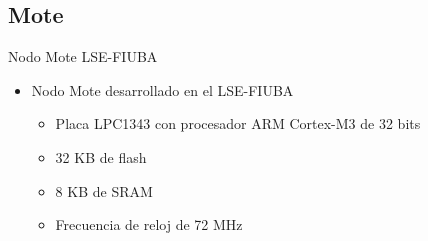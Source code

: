 \documentclass[aspectratio=169]{beamer}
\begin{document}
\subsection[Mote]{Mote}
\begin{frame}{Nodo Mote LSE-FIUBA} 

\begin{minipage}[c]{1.0\linewidth}
	\begin{minipage}[c]{0.6\linewidth}
		\begin{itemize}
			\item Nodo Mote desarrollado en el LSE-FIUBA
			\vspace{15px}
			\begin{itemize}
				\item Placa LPC1343 con procesador ARM Cortex-M3 de 32 bits
				\vspace{5px}
				\item 32 KB de flash
				\vspace{5px}
				\item 8 KB de SRAM
				\vspace{5px}
				\item Frecuencia de reloj de 72 MHz
			\end{itemize}
			\vspace{10px}
		\end{itemize}
	\end{minipage}
	\begin{minipage}[c]{0.35\linewidth}
		\begin{figure}[H]
			\label{Mote LSE}
		\end{figure}	  	  	
	\end{minipage}
\end{minipage}
\end{frame}

\end{document}
